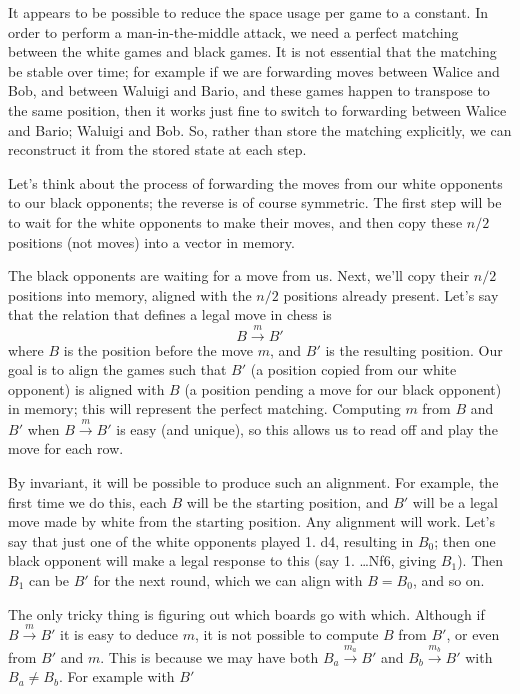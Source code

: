 \documentclass[twocolumn]{amsart}
\begin{document}
It appears to be possible to reduce the space usage per game to a
constant. In order to perform a man-in-the-middle attack, we need
a perfect matching between the white games and black games. It is
not essential that the matching be stable over time; for example
if we are forwarding moves between Walice and Bob, and between
Waluigi and Bario, and these games happen to transpose to the same
position, then it works just fine to switch to forwarding between
Walice and Bario; Waluigi and Bob. So, rather than store the
matching explicitly, we can reconstruct it from the stored state
at each step.

Let's think about the process of forwarding the moves from our white
opponents to our black opponents; the reverse is of course symmetric.
The first step will be to wait for the white opponents to make their
moves, and then copy these $n/2$ positions (not moves) into a vector
in memory.

\newcommand\stepsto[1]{\stackrel{#1}{\rightarrow}}
The black opponents are waiting for a move from us. Next, we'll copy
their $n/2$ positions into memory, aligned with the $n/2$ positions
already present. Let's say that the relation that defines a legal
move in chess is
%
$$
B \stepsto{m} B'
$$ 
%
where $B$ is the position before the move $m$, and $B'$ is the
resulting position. Our goal is to align the games such that $B'$ (a
position copied from our white opponent) is aligned with $B$ (a
position pending a move for our black opponent) in memory; this will
represent the perfect matching. Computing $m$ from $B$ and $B'$ when
$B \stepsto{m} B'$ is easy (and unique), so this allows us to read off
and play the move for each row.

By invariant, it will be possible to produce such an alignment. For
example, the first time we do this, each $B$ will be the starting
position, and $B'$ will be a legal move made by white from the
starting position. Any alignment will work. Let's say that just one of
the white opponents played 1. d4, resulting in $B_0$; then one black
opponent will make a legal response to this (say 1. \ldots Nf6, giving
$B_1$). Then $B_1$ can be $B'$ for the next round, which we can align
with $B=B_0$, and so on.

The only tricky thing is figuring out which boards go with which.
Although if $B \stepsto{m} B'$ it is easy to deduce $m$, it is not
possible to compute $B$ from $B'$, or even from $B'$ and $m$. This is
because we may have both $B_a \stepsto{m_a} B'$ and $B_b \stepsto{m_b}
B'$ with $B_a \neq B_b$. For example with $B'$
\end{document}
